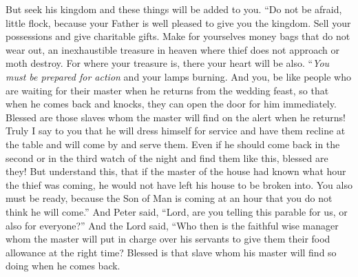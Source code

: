 \begin{biblechapter}
\verse But seek his kingdom and these things will be added to you.
\verse “Do not be afraid, little flock, because your Father is well pleased to give you the kingdom.
\verse Sell your possessions and give charitable gifts. Make for yourselves money bags that do not wear out, an inexhaustible treasure in heaven where thief does not approach or moth destroy.
\verse For where your treasure is, there your heart will be also.
 “\textit{You must be prepared for action} and your lamps burning.
\verse And you, be like people who are waiting for their master when he returns from the wedding feast, so that when he comes back and knocks, they can open the door for him immediately.
\verse Blessed are those slaves whom the master will find on the alert when he returns! Truly I say to you that he will dress himself for service and have them recline at the table and will come by and serve them.
\verse Even if he should come back in the second or in the third watch of the night and find them like this, blessed are they!
\verse But understand this, that if the master of the house had known what hour the thief was coming, he would not have left his house to be broken into.
\verse You also must be ready, because the Son of Man is coming at an hour that you do not think he will come.”
 And Peter said, “Lord, are you telling this parable for us, or also for everyone?”
\verse And the Lord said, “Who then is the faithful wise manager whom the master will put in charge over his servants to give them their food allowance at the right time?
\verse Blessed is that slave whom his master will find so doing when he comes back.

\end{biblechapter}
